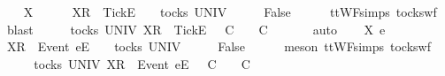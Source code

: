 \isamarkupfalse%
\isanewline
\ \ \isamarkupfalse%
\ X\ {\isasymrho}\ {\isasymsigma}\isanewline
\ \ \isamarkupfalse%
\ {\isachardoublequoteopen}{\isacharbrackleft}X{\isacharbrackright}\isactrlsub R\ {\isacharhash}\ {\isacharbrackleft}Tick{\isacharbrackright}\isactrlsub E\ {\isacharhash}\ {\isasymrho}\ {\isasymin}\ tocks\ UNIV{\isachardoublequoteclose}\isanewline
\ \ \isamarkupfalse%
\ \isamarkupfalse%
\ {\isachardoublequoteopen}False{\isachardoublequoteclose}\isanewline
\ \ \ \ \isamarkupfalse%
\ ttWF{\isachardot}simps{\isacharparenleft}{}{}{\isacharparenright}\ tocks{\isacharunderscore}wf\ \isamarkupfalse%
\ blast\isanewline
\ \ \isamarkupfalse%
\ \isamarkupfalse%
\ {\isachardoublequoteopen}{\isasymexists}{\isasymrho}{\isacharprime}{\isasymin}tocks\ UNIV{\isachardot}\ {\isacharbrackleft}X{\isacharbrackright}\isactrlsub R\ {\isacharhash}\ {\isacharbrackleft}Tick{\isacharbrackright}\isactrlsub E\ {\isacharhash}\ {\isasymrho}\ {\isasymlesssim}\isactrlsub C\ {\isasymrho}{\isacharprime}\ {\isasymand}\ {\isasymrho}{\isacharprime}\ {\isasymle}\isactrlsub C\ {\isasymsigma}{\isachardoublequoteclose}\isanewline
\ \ \ \ \isamarkupfalse%
\ auto\isanewline
{}\isamarkupfalse%
\isanewline
\ \ \isamarkupfalse%
\ X\ e\ {\isasymrho}\ {\isasymsigma}\isanewline
\ \ \isamarkupfalse%
\ {\isachardoublequoteopen}{\isacharbrackleft}X{\isacharbrackright}\isactrlsub R\ {\isacharhash}\ {\isacharbrackleft}Event\ e{\isacharbrackright}\isactrlsub E\ {\isacharhash}\ {\isasymrho}\ {\isasymin}\ tocks\ UNIV{\isachardoublequoteclose}\isanewline
\ \ \isamarkupfalse%
\ \isamarkupfalse%
\ {\isachardoublequoteopen}False{\isachardoublequoteclose}\isanewline
\ \ \ \ \isamarkupfalse%
\ {\isacharparenleft}meson\ ttWF{\isachardot}simps{\isacharparenleft}{}{}{\isacharparenright}\ tocks{\isacharunderscore}wf{\isacharparenright}\isanewline
\ \ \isamarkupfalse%
\ \isamarkupfalse%
\ {\isachardoublequoteopen}{\isasymexists}{\isasymrho}{\isacharprime}{\isasymin}tocks\ UNIV{\isachardot}\ {\isacharbrackleft}X{\isacharbrackright}\isactrlsub R\ {\isacharhash}\ {\isacharbrackleft}Event\ e{\isacharbrackright}\isactrlsub E\ {\isacharhash}\ {\isasymrho}\ {\isasymlesssim}\isactrlsub C\ {\isasymrho}{\isacharprime}\ {\isasymand}\ {\isasymrho}{\isacharprime}\ {\isasymle}\isactrlsub C\ {\isasymsigma}{\isachardoublequoteclose}\isanewline
